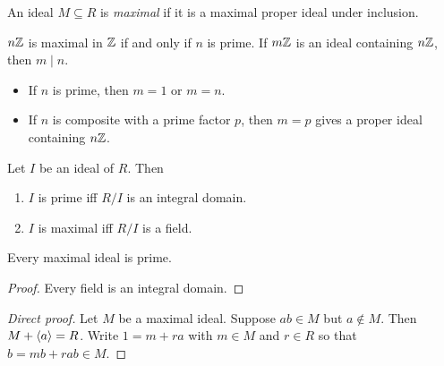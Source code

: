 \begin{definition*} \label{def:comm-ideals:maximal}
    An ideal $M \subseteq R$ is \emph{maximal} if it is a maximal proper
    ideal under inclusion.
\end{definition*}
\begin{examples}
    \item $n\mathbb{Z}$ is maximal in $\mathbb{Z}$ if and only if $n$ is prime.
        If $m\mathbb{Z}$ is an ideal containing $n\mathbb{Z}$, then $m \mid n$.
        \begin{itemize}
            \item If $n$ is prime, then $m = 1$ or $m = n$.
            \item If $n$ is composite with a prime factor $p$, then
                $m = p$ gives a proper ideal containing $n\mathbb{Z}$.
        \end{itemize}
    \item
\end{examples}

\begin{proposition}
    Let $I$ be an ideal of $R$.
    Then
    \begin{enumerate}
        \item $I$ is prime iff $R/I$ is an integral domain.
        \item $I$ is maximal iff $R/I$ is a field.
    \end{enumerate}
\end{proposition}

\begin{proposition}
    Every maximal ideal is prime.
\end{proposition}
\begin{proof}
    Every field is an integral domain.
\end{proof}
\begin{proof}[Direct proof]
    Let $M$ be a maximal ideal.
    Suppose $ab \in M$ but $a \notin M$.
    Then $M + \langle a\rangle = R$.
    Write $1 = m + ra$ with $m \in M$ and $r \in R$
    so that $b = mb + rab \in M$.
\end{proof}


